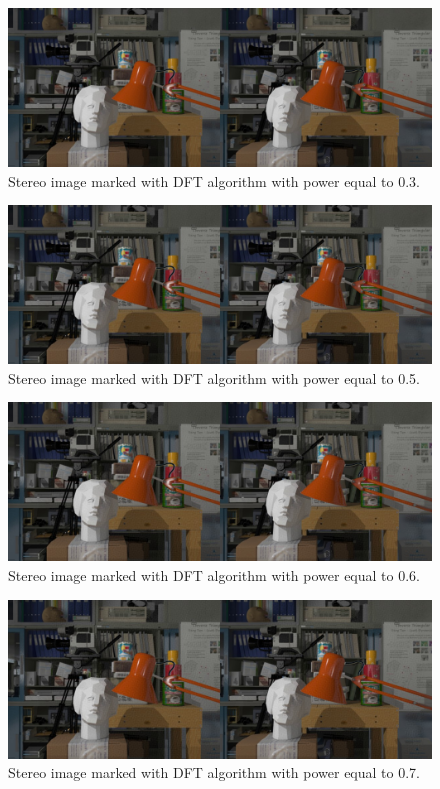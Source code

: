 \begin{figure}[h!]
\centering
\includegraphics[width=1\textwidth]{./img/marked_03_DFT.jpg}
\caption{\small{Stereo image marked with DFT algorithm with power equal to 0.3.}}
\label{fig:dft03}
\end{figure}
\begin{figure}[h!]
\centering
\includegraphics[width=1\textwidth]{./img/marked_05_DFT.jpg}
\caption{\small{Stereo image marked with DFT algorithm with power equal to 0.5.}}
\label{fig:dft05}
\end{figure}
\begin{figure}[h!]
\centering
\includegraphics[width=1\textwidth]{./img/marked_06_DFT.jpg}
\caption{\small{Stereo image marked with DFT algorithm with power equal to 0.6.}}
\label{fig:dft06}
\end{figure}
\begin{figure}[h!]
\centering
\includegraphics[width=1\textwidth]{./img/marked_07_DFT.jpg}
\caption{\small{Stereo image marked with DFT algorithm with power equal to 0.7.}}
\label{fig:dft07}
\end{figure}

